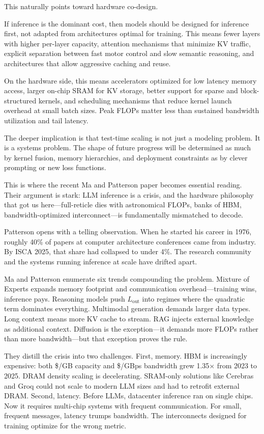 \documentclass[12pt]{article}
\begin{document}
This naturally points toward hardware co-design.

If inference is the dominant cost, then models should be designed for inference first, not adapted from architectures optimal for training. This means fewer layers with higher per-layer capacity, attention mechanisms that minimize KV traffic, explicit separation between fast motor control and slow semantic reasoning, and architectures that allow aggressive caching and reuse.

On the hardware side, this means accelerators optimized for low latency memory access, larger on-chip SRAM for KV storage, better support for sparse and block-structured kernels, and scheduling mechanisms that reduce kernel launch overhead at small batch sizes. Peak FLOPs matter less than sustained bandwidth utilization and tail latency.

The deeper implication is that test-time scaling is not just a modeling problem. It is a systems problem. The shape of future progress will be determined as much by kernel fusion, memory hierarchies, and deployment constraints as by clever prompting or new loss functions.

This is where the recent Ma and Patterson paper becomes essential reading. Their argument is stark: LLM inference is a crisis, and the hardware philosophy that got us here---full-reticle dies with astronomical FLOPs, banks of HBM, bandwidth-optimized interconnect---is fundamentally mismatched to decode.

Patterson opens with a telling observation. When he started his career in 1976, roughly 40\% of papers at computer architecture conferences came from industry. By ISCA 2025, that share had collapsed to under 4\%. The research community and the systems running inference at scale have drifted apart.

Ma and Patterson enumerate six trends compounding the problem. Mixture of Experts expands memory footprint and communication overhead---training wins, inference pays. Reasoning models push $L_\text{out}$ into regimes where the quadratic term dominates everything. Multimodal generation demands larger data types. Long context means more KV cache to stream. RAG injects external knowledge as additional context. Diffusion is the exception---it demands more FLOPs rather than more bandwidth---but that exception proves the rule.

They distill the crisis into two challenges. First, memory. HBM is increasingly expensive: both \$/GB capacity and \$/GBps bandwidth grew 1.35$\times$ from 2023 to 2025. DRAM density scaling is decelerating. SRAM-only solutions like Cerebras and Groq could not scale to modern LLM sizes and had to retrofit external DRAM. Second, latency. Before LLMs, datacenter inference ran on single chips. Now it requires multi-chip systems with frequent communication. For small, frequent messages, latency trumps bandwidth. The interconnects designed for training optimize for the wrong metric.
\end{document}
